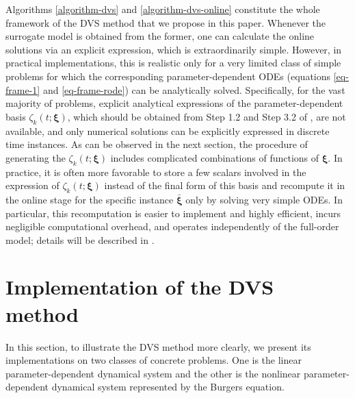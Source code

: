 \documentclass[10pt,a4paper]{article}
\numberwithin{equation}{section}
\numberwithin{lemma}{section}
\numberwithin{example}{section}
\numberwithin{definition}{section}
\numberwithin{assumption}{section}
\numberwithin{theorem}{section}
\numberwithin{proposition}{section}
\numberwithin{corollary}{section}
\numberwithin{remark}{section}
\begin{document}
Algorithms \ref{algorithm-dvs} and \ref{algorithm-dvs-online} constitute the whole framework of the DVS method that we propose in this paper. 
Whenever the surrogate model is obtained from the former, one can calculate the online solutions via an explicit expression, which is extraordinarily simple.
However, in practical implementations, this is realistic only for a very limited class of simple problems for which the corresponding parameter-dependent ODEs (equations \eqref{eq-frame-1} and \eqref{eq-frame-rode}) can be analytically solved. 
Specifically, for the vast majority of problems, explicit analytical expressions of the parameter-dependent basis \(\zeta_k(t;\bm{\xi})\), which should be obtained from Step 1.2 and Step 3.2 of , are not available, and only numerical solutions can be explicitly expressed in discrete time instances.
As can be observed in the next section, the procedure of generating the \(\zeta_k(t;\bm{\xi})\) includes complicated combinations of functions of $\bm{\xi}$.
In practice, it is often more favorable to store a few scalars involved in the expression of \(\zeta_k(t;\bm{\xi})\) instead of the final form of this basis and recompute it in the online stage for the specific instance $\bm{\bar\xi}$ only by solving very simple ODEs.
In particular, this recomputation is easier to implement and highly efficient, incurs negligible computational overhead, and operates independently of the full-order model; details will be described in .

 



\section{Implementation of the DVS method}
\label{sec-imple-dvs}
In this section, to illustrate the DVS method more clearly, we present its implementations on two classes of concrete problems.
One is the linear parameter-dependent dynamical system and the other is the nonlinear parameter-dependent dynamical system represented by the Burgers equation. 
\end{document}
